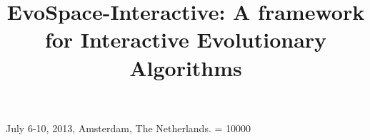 \documentclass{sig-alternate}
\begin{document}
 {July 6-10, 2013, Amsterdam, The Netherlands.}
\widowpenalty = 10000


%

\title{EvoSpace-Interactive: A framework for Interactive Evolutionary Algorithms}
%
%
%
%
%
\end{document}
